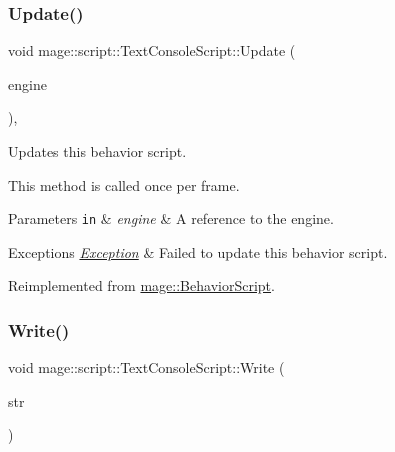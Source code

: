 \hypertarget{classmage_1_1script_1_1_text_console_script_ad619f93a946660b30f5e39821778f7b0}{}\label{classmage_1_1script_1_1_text_console_script_ad619f93a946660b30f5e39821778f7b0} 
\subsubsection{\texorpdfstring{Update()}{Update()}}
{\footnotesize\ttfamily void mage\+::script\+::\+Text\+Console\+Script\+::\+Update (\begin{DoxyParamCaption}\item[{\mbox{[}\mbox{[}maybe\+\_\+unused\mbox{]} \mbox{]} \hyperlink{classmage_1_1_engine}{Engine} \&}]{engine }\end{DoxyParamCaption})\hspace{0.3cm}{\ttfamily [override]}, {\ttfamily [virtual]}}

Updates this behavior script.

This method is called once per frame.


\begin{DoxyParams}[1]{Parameters}
\mbox{\tt in}  & {\em engine} & A reference to the engine. \\
\hline
\end{DoxyParams}

\begin{DoxyExceptions}{Exceptions}
{\em \hyperlink{classmage_1_1_exception}{Exception}} & Failed to update this behavior script. \\
\hline
\end{DoxyExceptions}


Reimplemented from \hyperlink{classmage_1_1_behavior_script_a085634661326b59850c1111e537baa4e}{mage\+::\+Behavior\+Script}.

\hypertarget{classmage_1_1script_1_1_text_console_script_a46610edcf7a1707476b87ad64f1ee68d}{}\label{classmage_1_1script_1_1_text_console_script_a46610edcf7a1707476b87ad64f1ee68d} 
\subsubsection{\texorpdfstring{Write()}{Write()}}
{\footnotesize\ttfamily void mage\+::script\+::\+Text\+Console\+Script\+::\+Write (\begin{DoxyParamCaption}\item[{\hyperlink{namespacemage_a8769f9d670d6b585ea306cb1062af94b}{Not\+Null}$<$ \hyperlink{namespacemage_ac409e0f2a22292a3a4cd42742994fbf0}{const\+\_\+wzstring} $>$}]{str }\end{DoxyParamCaption})}


